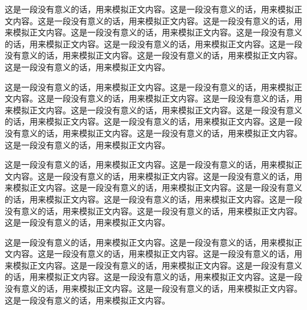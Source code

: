 
这是一段没有意义的话，用来模拟正文内容。这是一段没有意义的话，用来模拟正文内容。这是一段没有意义的话，用来模拟正文内容。这是一段没有意义的话，用来模拟正文内容。这是一段没有意义的话，用来模拟正文内容。这是一段没有意义的话，用来模拟正文内容。这是一段没有意义的话，用来模拟正文内容。这是一段没有意义的话，用来模拟正文内容。这是一段没有意义的话，用来模拟正文内容。这是一段没有意义的话，用来模拟正文内容。


这是一段没有意义的话，用来模拟正文内容。这是一段没有意义的话，用来模拟正文内容。这是一段没有意义的话，用来模拟正文内容。这是一段没有意义的话，用来模拟正文内容。这是一段没有意义的话，用来模拟正文内容。这是一段没有意义的话，用来模拟正文内容。这是一段没有意义的话，用来模拟正文内容。这是一段没有意义的话，用来模拟正文内容。这是一段没有意义的话，用来模拟正文内容。这是一段没有意义的话，用来模拟正文内容。

\todo{}

这是一段没有意义的话，用来模拟正文内容。这是一段没有意义的话，用来模拟正文内容。这是一段没有意义的话，用来模拟正文内容。这是一段没有意义的话，用来模拟正文内容。这是一段没有意义的话，用来模拟正文内容。这是一段没有意义的话，用来模拟正文内容。这是一段没有意义的话，用来模拟正文内容。这是一段没有意义的话，用来模拟正文内容。这是一段没有意义的话，用来模拟正文内容。这是一段没有意义的话，用来模拟正文内容。

这是一段没有意义的话，用来模拟正文内容。这是一段没有意义的话，用来模拟正文内容。这是一段没有意义的话，用来模拟正文内容。这是一段没有意义的话，用来模拟正文内容。这是一段没有意义的话，用来模拟正文内容。这是一段没有意义的话，用来模拟正文内容。这是一段没有意义的话，用来模拟正文内容。这是一段没有意义的话，用来模拟正文内容。这是一段没有意义的话，用来模拟正文内容。这是一段没有意义的话，用来模拟正文内容。

